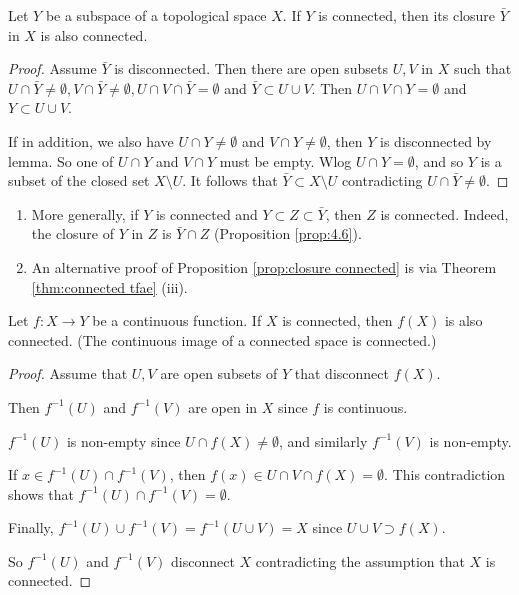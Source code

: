 \documentclass[a4paper]{article}
\begin{document}
\begin{proposition}\label{prop:closure connected}
    Let $Y$ be a subspace of a topological space $X$. If $Y$ is connected, then its closure $\bar{Y}$ in $X$ is also connected.
\end{proposition}
\begin{proof}
    Assume $\bar{Y}$ is disconnected. Then there are open subsets $U, V$ in $X$ such that $U \cap \bar{Y} \neq \emptyset, V \cap \bar{Y} \neq \emptyset, U \cap V \cap \bar{Y}=\emptyset$ and $\bar{Y} \subset U \cup V$. Then $U \cap V \cap Y=\emptyset$ and $Y \subset U \cup V$.

    If in addition, we also have $U \cap Y \neq \emptyset$ and $V \cap Y \neq \emptyset$, then $Y$ is disconnected by lemma. So one of $U \cap Y$ and $V \cap Y$ must be empty. Wlog $U \cap Y=\emptyset$, and so $Y$ is a subset of the closed set $X \setminus U$. It follows that $\bar{Y} \subset X \setminus U$ contradicting $U \cap \bar{Y} \neq \emptyset$.
\end{proof}

\begin{remark}
    \begin{enumerate}
        \item More generally, if $Y$ is connected and $Y \subset Z \subset \bar{Y}$, then $Z$ is connected. Indeed, the closure of $Y$ in $Z$ is $\bar{Y} \cap Z$ (Proposition \ref{prop:4.6}).
      
        \item An alternative proof of Proposition \ref{prop:closure connected} is via Theorem \ref{thm:connected tfae} (iii).
      
      \end{enumerate}
\end{remark}

\begin{theorem}\label{thm:continuous image connected}
    Let $f: X \rightarrow Y$ be a continuous function. If $X$ is connected, then $f(X)$ is also connected. (The continuous image of a connected space is connected.)
\end{theorem}

\begin{proof}
    Assume that $U, V$ are open subsets of $Y$ that disconnect $f(X)$.

    Then $f^{-1}(U)$ and $f^{-1}(V)$ are open in $X$ since $f$ is continuous.

    $f^{-1}(U)$ is non-empty since $U \cap f(X) \neq \emptyset$, and similarly $f^{-1}(V)$ is non-empty.

    If $x \in f^{-1}(U) \cap f^{-1}(V)$, then $f(x) \in U \cap V \cap f(X)=\emptyset$. This contradiction shows that $f^{-1}(U) \cap f^{-1}(V)=\emptyset$.

    Finally, $f^{-1}(U) \cup f^{-1}(V)=f^{-1}(U \cup V)=X$ since $U \cup V \supset f(X)$.

    So $f^{-1}(U)$ and $f^{-1}(V)$ disconnect $X$ contradicting the assumption that $X$ is connected.
\end{proof}
\end{document}
